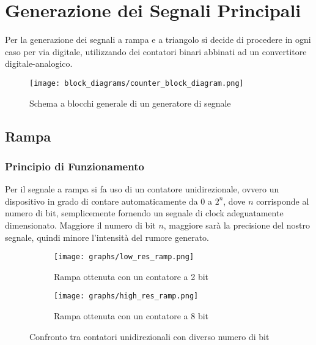 \chapter{Generazione dei Segnali Principali}


Per la generazione dei segnali a rampa e a triangolo si decide di procedere in ogni caso
per via digitale, utilizzando dei contatori binari abbinati ad un convertitore
digitale-analogico.
\medskip

\begin{figure}[ht]
    \centering
    \texttt{[image: block\_diagrams/counter\_block\_diagram.png]}
    \caption{Schema a blocchi generale di un generatore di segnale}
    \label{counter_block_diagram}
\end{figure}


\section{Rampa}


\subsection*{Principio di Funzionamento}


Per il segnale a rampa si fa uso di un contatore unidirezionale, ovvero un dispositivo
in grado di contare automaticamente da $0$ a $2^n$, dove $n$ corrisponde al numero di bit,
semplicemente fornendo un segnale di clock adeguatamente dimensionato. Maggiore il numero
di bit $n$, maggiore sarà la precisione del nostro segnale, quindi minore l'intensità del
rumore generato.
\medskip

\begin{figure}[ht]
    \centering

    \begin{subfigure}{.5\textwidth}
        \centering
        \texttt{[image: graphs/low\_res\_ramp.png]}
        \caption{Rampa ottenuta con un contatore a 2 bit}
        \label{low_res_ramp}
    \end{subfigure}%
    \begin{subfigure}{.5\textwidth}
        \centering
        \texttt{[image: graphs/high\_res\_ramp.png]}
        \caption{Rampa ottenuta con un contatore a 8 bit}
        \label{high_res_ramp}
    \end{subfigure}

    \caption{Confronto tra contatori unidirezionali con diverso numero di bit}
    \label{ramps}
\end{figure}

